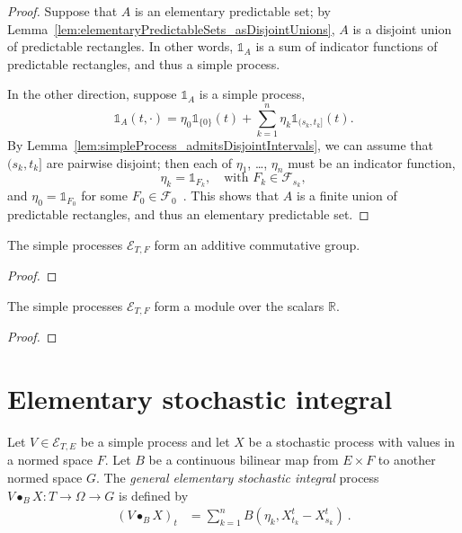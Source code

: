 \begin{proof}
  Suppose that $A$ is an elementary predictable set;
  by Lemma~\ref{lem:elementaryPredictableSets_asDisjointUnions},
  $A$ is a disjoint union of predictable rectangles.
  In other words, $\mathbb{1}_A$
  is a sum of indicator functions of predictable rectangles, and thus a simple process.

  In the other direction, suppose $\mathbb{1}_A$ is a simple process,
  \[
  \mathbb{1}_A(t,\cdot) = \eta_0 \mathbb{1}_{\{0\}}(t) + \sum_{k=1}^{n} \eta_k \mathbb{1}_{(s_k, t_k]}(t).
  \]
  By Lemma~\ref{lem:simpleProcess_admitsDisjointIntervals},
  we can assume that $(s_k, t_k]$ are pairwise disjoint;
  then each of $\eta_1$, \dots, $\eta_n$ must be an indicator function,
  \[
  \eta_k = \mathbb{1}_{F_k}, \quad\text{with } F_k \in \mathcal{F}_{s_k},
  \]
  and $\eta_0 = \mathbb{1}_{F_0}$ for some $F_0 \in \mathcal{F}_0$~.
  This shows that $A$ is a finite union of predictable rectangles, and thus an elementary predictable set.
\end{proof}


\begin{lemma}\label{lem:addCommGroup_simpleProcess}
  \leanok
The simple processes $\mathcal{E}_{T, F}$ form an additive commutative group.
\end{lemma}

\begin{proof}
  \leanok
\end{proof}


\begin{lemma}\label{lem:module_simpleProcess}
  \leanok
The simple processes $\mathcal{E}_{T, F}$ form a module over the scalars $\mathbb{R}$.
\end{lemma}

\begin{proof}
  \leanok
\end{proof}

\section{Elementary stochastic integral}

\begin{definition}\label{def:elemStochIntegralBilin}
  \leanok
Let $V \in \mathcal{E}_{T, E}$ be a simple process and let $X$ be a stochastic process with values in a normed space $F$.
Let $B$ be a continuous bilinear map from $E \times F$ to another normed space $G$.
The \emph{general elementary stochastic integral} process $V \bullet_B X : T \to \Omega \to G$ is defined by
\begin{align*}
  (V \bullet_B X)_t
  &= \sum_{k=1}^{n} B (\eta_k, X^t_{t_k} - X^t_{s_k})
  \: .
\end{align*}
\end{definition}


